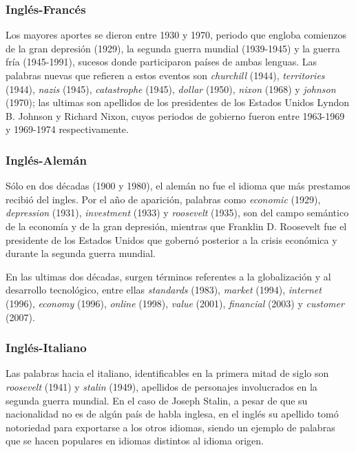 \subsubsection*{Inglés-Francés} %


Los mayores aportes se dieron entre 1930 y 1970, periodo que engloba comienzos de la gran depresión (1929), la segunda guerra mundial (1939-1945) y la guerra fría (1945-1991), sucesos donde participaron países de ambas lenguas. Las palabras nuevas que refieren a estos eventos son \textit{churchill} (1944), \textit{territories} (1944), \textit{nazis} (1945), \textit{catastrophe} (1945), \textit{dollar} (1950), \textit{nixon} (1968) y \textit{johnson} (1970); las ultimas son apellidos de los presidentes de los Estados Unidos  Lyndon B. Johnson y Richard Nixon, cuyos periodos de gobierno fueron  entre 1963-1969 y 1969-1974 respectivamente.

\subsubsection*{Inglés-Alemán} %

Sólo  en dos décadas (1900  y 1980), el alemán no fue el idioma que más prestamos recibió  del ingles. Por el año de aparición, palabras como \textit{economic} (1929), \textit{depression} (1931), \textit{investment} (1933) y \textit{roosevelt} (1935), son del campo semántico de la economía y de la gran depresión,  mientras que  Franklin D. Roosevelt fue el presidente de los Estados Unidos que gobernó posterior a la crisis económica y durante la segunda guerra mundial. 


En las ultimas dos décadas, surgen términos referentes a la globalización y al desarrollo tecnológico, entre ellas \textit{standards} (1983), \textit{market} (1994), \textit{internet} (1996), \textit{economy} (1996), \textit{online} (1998), \textit{value} (2001), \textit{financial} (2003) y \textit{customer} (2007). 
\subsubsection*{Inglés-Italiano} %


Las palabras hacia el italiano, identificables en la primera mitad de siglo son \textit{roosevelt} (1941) y \textit{stalin} (1949), apellidos de personajes involucrados en la segunda guerra mundial. En el caso de Joseph Stalin, a pesar de que su nacionalidad no es de algún país de habla inglesa, en el inglés su apellido tomó notoriedad para exportarse a los otros idiomas, siendo un ejemplo de palabras que se hacen populares en idiomas distintos al idioma origen. 

